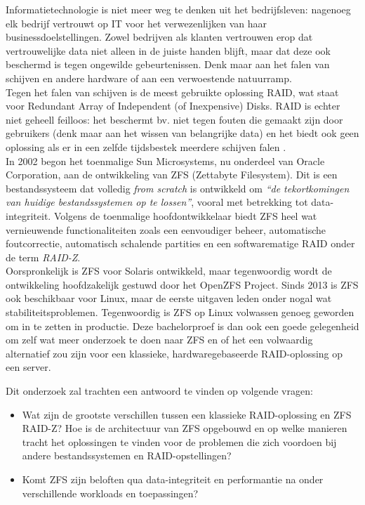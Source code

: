 \documentclass[fleqn,10pt]{voorstel}
\begin{document}
Informatietechnologie is niet meer weg te denken uit het bedrijfsleven: nagenoeg elk bedrijf vertrouwt op IT voor het verwezenlijken van haar businessdoelstellingen. Zowel bedrijven als klanten vertrouwen erop dat vertrouwelijke data niet alleen in de juiste handen blijft, maar dat deze ook beschermd is tegen ongewilde gebeurtenissen. Denk maar aan het falen van schijven en andere hardware of aan een verwoestende natuurramp. \\
Tegen het falen van schijven is de meest gebruikte oplossing RAID, wat staat voor Redundant Array of Independent (of Inexpensive) Disks. RAID is echter niet geheell feilloos: het beschermt bv. niet tegen fouten die gemaakt zijn door gebruikers (denk maar aan het wissen van belangrijke data) en het biedt ook geen oplossing als er in een zelfde tijdsbestek meerdere schijven falen \autocite{PeterM.Chen1993}. \\
In 2002 begon het toenmalige Sun Microsystems, nu onderdeel van Oracle Corporation, aan de ontwikkeling van ZFS (Zettabyte Filesystem). Dit is een bestandssysteem dat volledig \textit{from scratch} is ontwikkeld om \textit{``de tekortkomingen van huidige bestandssystemen op te lossen''}\autocite{JeffBonwick_lastZFS}, vooral met betrekking tot data-integriteit. Volgens de toenmalige hoofdontwikkelaar \textcite{ZFSBonwick} biedt ZFS heel wat vernieuwende functionaliteiten zoals een eenvoudiger beheer, automatische foutcorrectie, automatisch schalende partities en een softwarematige RAID onder de term \textit{RAID-Z}. \\
Oorspronkelijk is ZFS voor Solaris ontwikkeld, maar tegenwoordig wordt de ontwikkeling hoofdzakelijk gestuwd door het OpenZFS Project\autocite{OpenZFSHistory2014}. Sinds 2013 is ZFS ook beschikbaar voor Linux, maar de eerste uitgaven leden onder nogal wat stabiliteitsproblemen. Tegenwoordig is ZFS op Linux volwassen genoeg geworden om in te zetten in productie. Deze bachelorproef is dan ook een goede gelegenheid om zelf wat meer onderzoek te doen naar ZFS en of het een volwaardig alternatief zou zijn voor een klassieke, hardwaregebaseerde RAID-oplossing op een server.

Dit onderzoek zal trachten een antwoord te vinden op volgende vragen:

\begin{itemize}
\item{Wat zijn de grootste verschillen tussen een klassieke RAID-oplossing en ZFS RAID-Z? Hoe is de architectuur van ZFS opgebouwd en op welke manieren tracht het oplossingen te vinden voor de problemen die zich voordoen bij andere bestandssystemen en RAID-opstellingen?}
  \item{Komt ZFS zijn beloften qua data-integriteit en performantie na onder verschillende workloads en toepassingen?}
\end{itemize}
\end{document}
